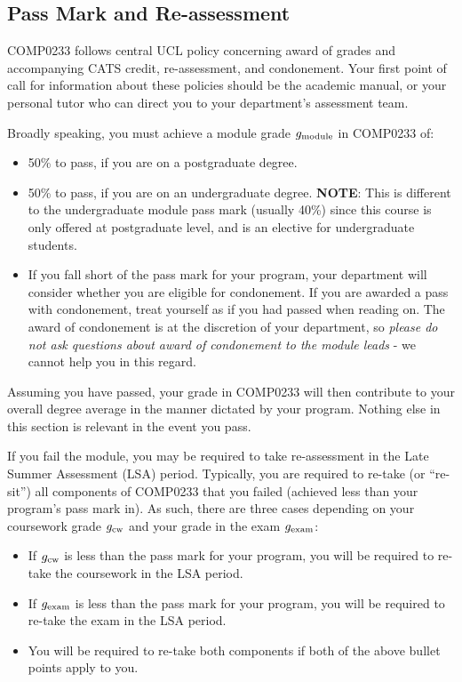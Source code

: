 \subsection{Pass Mark and Re-assessment}

COMP0233 follows central UCL policy concerning award of grades and accompanying CATS credit, re-assessment, and condonement.
Your first point of call for information about these policies should be the academic manual, or your personal tutor who can direct you to your department's assessment team.

Broadly speaking, you must achieve a module grade $g_{\mathrm{module}}$ in COMP0233 of:

\begin{itemize}
  \item 50\% to pass, if you are on a postgraduate degree.
  \item 50\% to pass, if you are on an undergraduate degree.
        \textbf{NOTE}: This is different to the undergraduate module pass mark (usually 40\%) since this course is only offered at postgraduate level, and is an elective for undergraduate students.
  \item If you fall short of the pass mark for your program, your department will consider whether you are eligible for condonement.
        If you are awarded a pass with condonement, treat yourself as if you had passed when reading on.
        The award of condonement is at the discretion of your department, so \emph{please do not ask questions about award of condonement to the module leads} - we cannot help you in this regard.
\end{itemize}

Assuming you have passed, your grade in COMP0233 will then contribute to your overall degree average in the manner dictated by your program.
Nothing else in this section is relevant in the event you pass.

If you fail the module, you may be required to take re-assessment in the Late Summer Assessment (LSA) period.
Typically, you are required to re-take (or ``re-sit'') all components of COMP0233 that you failed (achieved less than your program's pass mark in).
As such, there are three cases depending on your coursework grade $g_{\mathrm{cw}}$ and your grade in the exam $g_{\mathrm{exam}}$:

\begin{itemize}
  \item If $g_{\mathrm{cw}}$ is less than the pass mark for your program, you will be required to re-take the coursework in the LSA period.
  \item If $g_{\mathrm{exam}}$ is less than the pass mark for your program, you will be required to re-take the exam in the LSA period.
  \item You will be required to re-take both components if both of the above bullet points apply to you.
\end{itemize}

